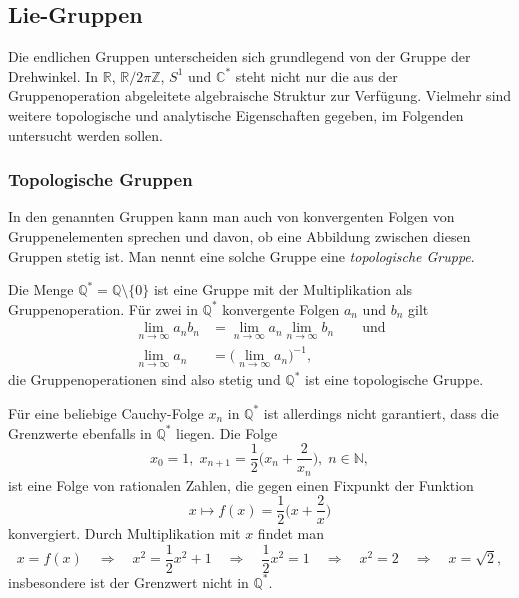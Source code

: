 %
%
%

%
%
\subsection{Lie-Gruppen
\label{buch:gruppen:subsection:lie-gruppen}}
Die endlichen Gruppen unterscheiden sich grundlegend von der Gruppe
der Drehwinkel.
In $\mathbb{R}$, $\mathbb{R}/2\pi\mathbb{Z}$, $S^1$ und $\mathbb{C}^*$
steht nicht nur die aus der Gruppenoperation abgeleitete algebraische
Struktur zur Verfügung.
Vielmehr sind weitere topologische und analytische Eigenschaften 
gegeben, im Folgenden untersucht werden sollen.

%
%
\subsubsection{Topologische Gruppen}
In den genannten Gruppen kann man auch von konvergenten Folgen
von Gruppenelementen
sprechen und davon, ob eine Abbildung zwischen diesen Gruppen
stetig ist.
Man nennt eine solche Gruppe eine {\em topologische Gruppe}.
%

\begin{beispiel}
Die Menge
\(
\mathbb{Q}^*
=
\mathbb{Q} \setminus\{0\}
\)
ist eine Gruppe mit der Multiplikation als Gruppenoperation.
Für zwei in $\mathbb{Q}^*$ konvergente Folgen $a_n$ und $b_n$ gilt
\begin{align*}
\lim_{n\to\infty} a_nb_n
&=
\lim_{n\to\infty} a_n
\lim_{n\to\infty} b_n
\qquad\text{und}
\\
\lim_{n\to\infty} a_n
&=
\bigl(
\lim_{n\to\infty} a_n
\bigr)^{-1},
\end{align*}
die Gruppenoperationen sind also stetig und $\mathbb{Q}^*$
ist eine topologische Gruppe.

Für eine beliebige Cauchy-Folge $x_n$ in $\mathbb{Q}^*$
ist allerdings nicht garantiert, dass die Grenzwerte ebenfalls
in $\mathbb{Q}^*$ liegen.
Die Folge
\[
x_0=1,\;
x_{n+1} = \frac12\biggl(x_n+\frac{2}{x_n}\biggr),\; n\in\mathbb{N},
\]
ist eine Folge von rationalen Zahlen, die gegen einen Fixpunkt der
Funktion
\[
x\mapsto f(x)=\frac12\biggl(x+\frac{2}{x}\biggr)
\]
konvergiert.
Durch Multiplikation mit $x$ findet man
\[
x=f(x)
\quad\Rightarrow\quad
x^2=\frac12 x^2 + 1
\quad\Rightarrow\quad
\frac12x^2=1
\quad\Rightarrow\quad
x^2=2
\quad\Rightarrow\quad
x=\!\sqrt{2},
\]
insbesondere ist der Grenzwert nicht in $\mathbb{Q}^*$.
\end{beispiel}

